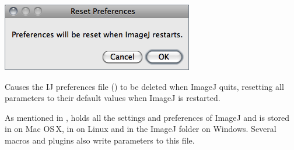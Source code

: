 

\subsubsection[\protect\userinterface{Reset\ldots{}}]{\protect{}\label{sub:ResetOptions}}

\begin{minipage}[c][1\totalheight][t]{0.445\columnwidth}%
\includegraphics[scale=0.55]{images/ResetOptions}%
\end{minipage}%
\begin{minipage}[c][1\totalheight][t]{0.555\columnwidth}%
Causes the IJ preferences file () to be
deleted when ImageJ quits, resetting all parameters
to their default values when ImageJ is restarted.%
\end{minipage}

As mentioned in , 
holds all the settings and preferences of ImageJ and is stored in
 on Mac OS\,X, in 
on Linux and in the ImageJ folder on Windows. Several macros and plugins
also write parameters to this file.



\clearpage{}


\section{\protect{}\label{sec:Image}}


\subsection{\protect{}\label{sub:Type}}

